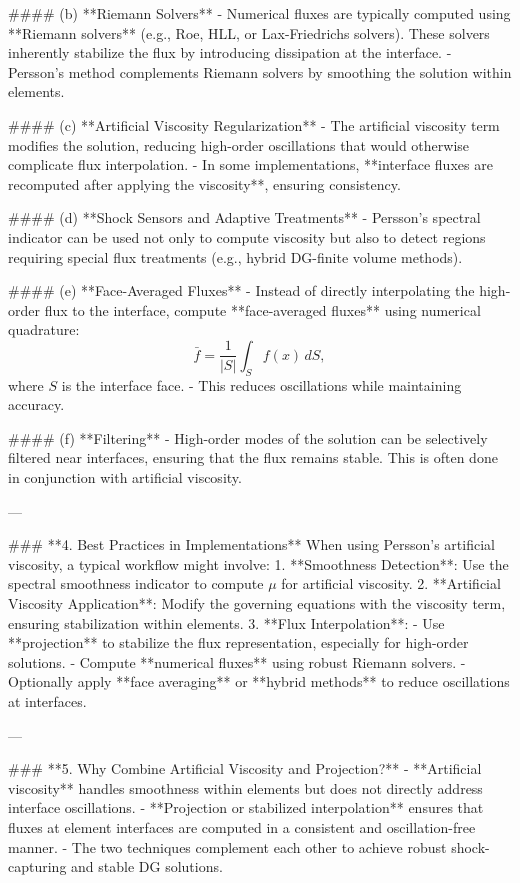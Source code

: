 #### (b) **Riemann Solvers**
- Numerical fluxes are typically computed using **Riemann solvers** (e.g., Roe, HLL, or Lax-Friedrichs solvers). These solvers inherently stabilize the flux by introducing dissipation at the interface.
- Persson's method complements Riemann solvers by smoothing the solution within elements.

#### (c) **Artificial Viscosity Regularization**
- The artificial viscosity term modifies the solution, reducing high-order oscillations that would otherwise complicate flux interpolation.
- In some implementations, **interface fluxes are recomputed after applying the viscosity**, ensuring consistency.

#### (d) **Shock Sensors and Adaptive Treatments**
- Persson's spectral indicator can be used not only to compute viscosity but also to detect regions requiring special flux treatments (e.g., hybrid DG-finite volume methods).

#### (e) **Face-Averaged Fluxes**
- Instead of directly interpolating the high-order flux to the interface, compute **face-averaged fluxes** using numerical quadrature:
  \[
  \bar{f} = \frac{1}{|S|} \int_S f(x) \, dS,
  \]
  where \( S \) is the interface face.
- This reduces oscillations while maintaining accuracy.

#### (f) **Filtering**
- High-order modes of the solution can be selectively filtered near interfaces, ensuring that the flux remains stable. This is often done in conjunction with artificial viscosity.

---

### **4. Best Practices in Implementations**
When using Persson's artificial viscosity, a typical workflow might involve:
1. **Smoothness Detection**: Use the spectral smoothness indicator to compute \(\mu\) for artificial viscosity.
2. **Artificial Viscosity Application**: Modify the governing equations with the viscosity term, ensuring stabilization within elements.
3. **Flux Interpolation**:
   - Use **projection** to stabilize the flux representation, especially for high-order solutions.
   - Compute **numerical fluxes** using robust Riemann solvers.
   - Optionally apply **face averaging** or **hybrid methods** to reduce oscillations at interfaces.

---

### **5. Why Combine Artificial Viscosity and Projection?**
- **Artificial viscosity** handles smoothness within elements but does not directly address interface oscillations.
- **Projection or stabilized interpolation** ensures that fluxes at element interfaces are computed in a consistent and oscillation-free manner.
- The two techniques complement each other to achieve robust shock-capturing and stable DG solutions.

